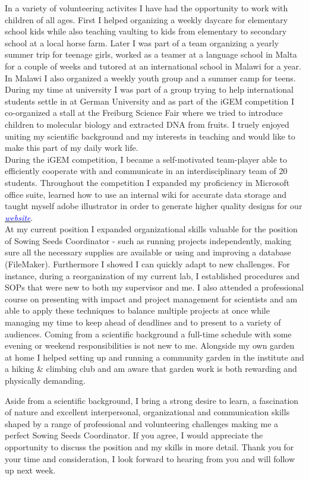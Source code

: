 \documentclass[11pt,a4paper,sans]{moderncv}
\begin{document}
\begin{spacing}{1.2}
In a variety of volunteering activites I have had the opportunity to work with children of all ages. First I helped organizing a weekly daycare for elementary school kids while also teaching vaulting to kids from elementary to secondary school at a local horse farm. Later I was part of a team organizing a yearly summer trip for teenage girls, worked as a teamer at a language school in Malta for a couple of weeks and tutored at an international school in Malawi for a year. In Malawi I also organized a weekly youth group and a summer camp for teens. During my time at university I was part of a group trying to help international students settle in at German University and as part of the iGEM competition I co-organized a stall at the Freiburg Science Fair  where we tried to introduce children to molecular biology and extracted DNA from fruits. I truely enjoyed uniting my scientific background and my interests in teaching and would like to make this part of my daily work life.\\
During the iGEM competition, I became a self-motivated team-player able to efficiently cooperate with and communicate in an interdisciplinary team of 20 students. Throughout the competition I expanded my proficiency in Microsoft office suite, learned how to use an internal wiki for accurate data storage and taught myself adobe illustrator in order to generate higher quality designs for our {\href{http://2015.igem.org/Team:Freiburg}{\textcolor{blue}{\textit{website}}}}.\\
At my current position I expanded organizational skills valuable for the position of Sowing Seeds Coordinator - such as running projects independently, making sure all the necessary supplies are available or using and improving a database (FileMaker). Furthermore I showed I can quickly adapt to new challenges. For instance, during a reorganization of my current lab, I established procedures and SOPs that were new to both my supervisor and me. I also attended a professional course on presenting with impact and project management for scientists and am able to apply these techniques to balance multiple projects at once while managing my time to keep ahead of deadlines and to present to a variety of audiences. Coming from a scientific background  a full-time schedule with some evening or weekend responsibilities is not new to me. Alongside my own garden at home I helped setting up and running a community garden in the institute and a hiking \& climbing club and am aware that garden work is both rewarding and physically demanding.\par%

Aside from a scientific background, I bring a strong desire to learn, a fascination of nature and excellent interpersonal, organizational and communication skills shaped by a range of professional and volunteering challenges making me a perfect Sowing Seeds Coordinator. If you agree, I would appreciate the opportunity to discuss the position and my skills in more detail. Thank you for your time and consideration, I look forward to hearing from you and will follow up next week.


 

\end{spacing}
\makeletterclosing
\end{document}
